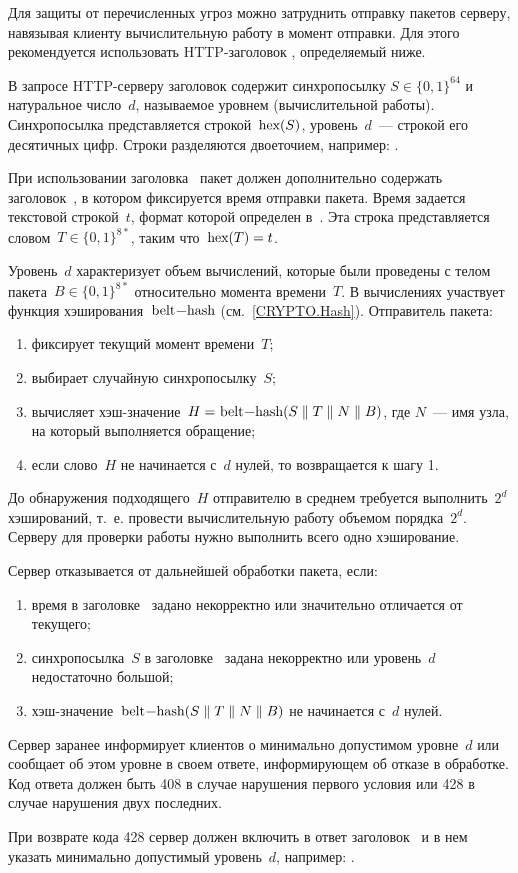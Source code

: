 Для защиты от перечисленных угроз можно затруднить отправку пакетов серверу,
навязывая клиенту вычислительную работу в момент отправки. Для этого
рекомендуется использовать HTTP-заголовок , определяемый ниже.

В запросе HTTP-серверу заголовок  содержит синхропосылку 
$S\in\{0,1\}^{64}$ и натуральное число~$d$, называемое уровнем 
(вычислительной работы).
%
Синхропосылка представляется строкой~$\code{hex}(S)$, уровень~$d$~--- 
строкой его десятичных цифр. Строки разделяются двоеточием,
например: .

При использовании заголовка~ пакет должен дополнительно
содержать заголовок~, в котором фиксируется время отправки 
пакета. Время задается текстовой строкой~$t$, формат которой определен 
в~\cite{HTTP}. Эта строка представляется словом~$T\in\{0,1\}^{8*}$, 
таким что~$\code{hex}(T)=t$.

Уровень~$d$ характеризует объем вычислений, которые были проведены
с телом пакета~$B\in\{0,1\}^{8*}$ относительно момента времени~$T$.
%
В вычислениях участвует функция хэширования~$\code{belt-hash}$
(см.~\ref{CRYPTO.Hash}). Отправитель пакета:
\begin{enumerate}[label=\arabic*)]
\item
фиксирует текущий момент времени~$T$;
\item
выбирает случайную синхропосылку~$S$;
\item
вычисляет хэш-значение~$H=\code{belt-hash}
(S\parallel T\parallel N\parallel B)$, 
где $N$~--- имя узла, на который выполняется обращение; 
\item
если слово~$H$ не начинается с~$d$ нулей, то возвращается к шагу 1.
\end{enumerate}

До обнаружения подходящего~$H$ отправителю в среднем требуется 
выполнить~$2^d$ хэширований, т.~е. провести вычислительную работу объемом  
порядка~$2^d$. Серверу для проверки работы нужно выполнить всего одно
хэширование.

Сервер отказывается от дальнейшей обработки пакета, если:
\begin{enumerate}[label=\arabic*)]
\item
время в заголовке~ задано некорректно или значительно 
отличается от текущего;
\item 
синхропосылка~$S$ в заголовке~ задана некорректно или 
уровень~$d$ недостаточно большой;
\item 
хэш-значение~$\code{belt-hash}(S\parallel T\parallel N\parallel B)$ 
не начинается с~$d$ нулей.
\end{enumerate}

Сервер заранее информирует клиентов о минимально допустимом уровне~$d$
или сообщает об этом уровне в своем ответе, информирующем об отказе 
в обработке. Код ответа должен быть 408 в случае нарушения первого 
условия или 428 в случае нарушения двух последних.

При возврате кода 428 сервер должен включить в ответ 
заголовок~ и в нем указать минимально допустимый 
уровень~$d$, например: .

